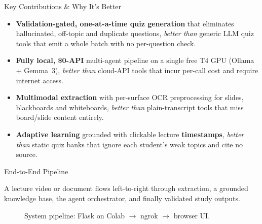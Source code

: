 \documentclass[final]{beamer}
\newlength{\colwidth}
\begin{document}
\begin{frame}[t]
\begin{columns}[t]
\begin{column}{\colwidth}
\begin{alertblock}{Key Contributions \& Why It's Better}
    \begin{itemize}
      \item \textbf{Validation-gated, one-at-a-time quiz generation} that
        eliminates hallucinated, off-topic and duplicate questions,
        \emph{better than} generic LLM quiz tools that emit a whole batch
        with no per-question check.
      \item \textbf{Fully local, \$0-API} multi-agent pipeline on a single free
        T4 GPU (Ollama + Gemma~3), \emph{better than} cloud-API tools that
        incur per-call cost and require internet access.
      \item \textbf{Multimodal extraction} with per-surface OCR preprocessing
        for slides, blackboards and whiteboards, \emph{better than}
        plain-transcript tools that miss board/slide content entirely.
      \item \textbf{Adaptive learning} grounded with clickable lecture
        \textbf{timestamps}, \emph{better than} static quiz banks that
        ignore each student's weak topics and cite no source.
    \end{itemize}

  \end{alertblock}

  \begin{block}{End-to-End Pipeline}

    A lecture video or document flows left-to-right through extraction, a grounded
    knowledge base, the agent orchestrator, and finally validated study outputs.

    \begin{figure}
      \centering
      \caption{System pipeline: Flask on Colab $\to$ ngrok $\to$ browser UI.}
    \end{figure}


\end{block}
\end{column}
\end{columns}
\end{frame}
\end{document}
